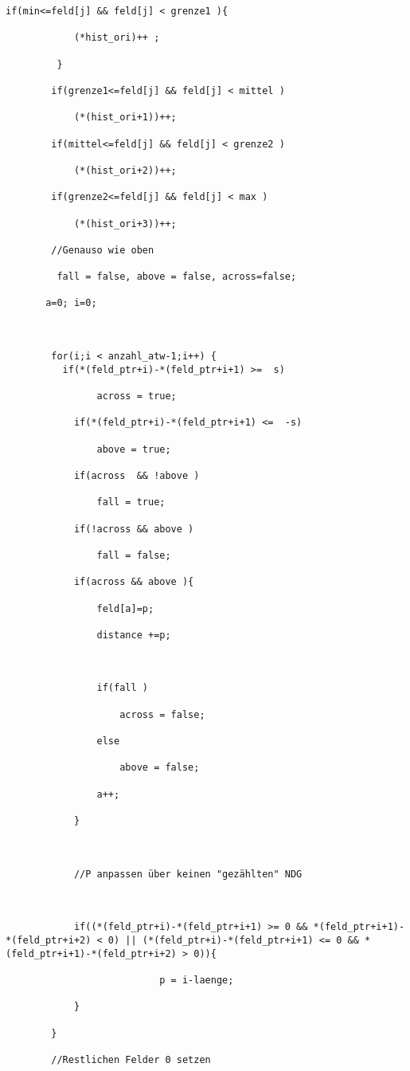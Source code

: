 \documentclass[a4paper,12pt]{article}
\begin{document}
\begin{lstlisting}[caption={histo.c}]
		if(min<=feld[j] && feld[j] < grenze1 ){

			(*hist_ori)++ ;

         }

		if(grenze1<=feld[j] && feld[j] < mittel )

			(*(hist_ori+1))++;

		if(mittel<=feld[j] && feld[j] < grenze2 )

			(*(hist_ori+2))++;

		if(grenze2<=feld[j] && feld[j] < max )

			(*(hist_ori+3))++;

		//Genauso wie oben

		 fall = false, above = false, across=false;

       a=0; i=0;



		for(i;i < anzahl_atw-1;i++) {	   
		  if(*(feld_ptr+i)-*(feld_ptr+i+1) >=  s)

				across = true;

			if(*(feld_ptr+i)-*(feld_ptr+i+1) <=  -s)

				above = true;

			if(across  && !above )

				fall = true;

			if(!across && above )

				fall = false;

			if(across && above ){

				feld[a]=p;

				distance +=p;



				if(fall )

					across = false;

				else

					above = false;

				a++;

			}



			//P anpassen über keinen "gezählten" NDG



			if((*(feld_ptr+i)-*(feld_ptr+i+1) >= 0 && *(feld_ptr+i+1)-*(feld_ptr+i+2) < 0) || (*(feld_ptr+i)-*(feld_ptr+i+1) <= 0 && *(feld_ptr+i+1)-*(feld_ptr+i+2) > 0)){

                           p = i-laenge;

			}

		}

		//Restlichen Felder 0 setzen


\end{lstlisting}
\end{document}
